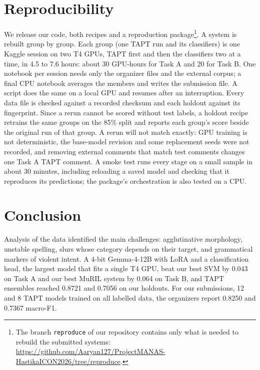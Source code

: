 \documentclass[11pt]{article}
\newcommand{\taska}{Task A}
\newcommand{\taskb}{Task B}
\begin{document}
\section{Reproducibility}
\label{sec:repro}
We release our code, both recipes and a reproduction package\footnote{The
branch \texttt{reproduce} of our repository contains only what is needed to rebuild
the submitted systems:
\url{https://github.com/Aaryan127/ProjectMANAS-HastikaICON2026/tree/reproduce}.}. A system is
rebuilt group by group. Each group (one TAPT run and its classifiers) is one
Kaggle session on two T4 GPUs, TAPT first and then the classifiers two at a
time, in 4.5 to 7.6 hours: about 30 GPU-hours for \taska{} and 20 for \taskb{}.
One notebook per session needs only the organizer files and the external
corpus; a final CPU notebook averages the members and writes
the submission file. A script does the same on a local GPU and resumes after an
interruption. Every data file is checked against a recorded checksum and each
holdout against its fingerprint. Since a rerun cannot be scored without test
labels, a holdout recipe retrains the same groups on the 85\% split and reports
each group's score beside the original run of that group. A rerun will not match
exactly: GPU training is not deterministic, the base-model revision and some
replacement seeds were not recorded, and removing external comments that match
test comments changes one \taska{} TAPT comment. A smoke test runs every stage
on a small sample in about 30 minutes, including reloading a saved model and
checking that it reproduces its predictions; the package's orchestration is also
tested on a CPU.

\section{Conclusion}
Analysis of the data identified the main challenges: agglutinative
morphology, unstable spelling, slurs whose category depends on their target, and
grammatical markers of violent intent. A 4-bit Gemma-4-12B with LoRA and a
classification head, the largest model that fits a single T4 GPU, beat our
best SVM by 0.043 on \taska{} and our best MuRIL system by 0.064 on \taskb{}, and
TAPT ensembles reached 0.8721 and 0.7056 on our holdouts. For our submissions,
12 and 8 TAPT models trained on all labelled data, the organizers report 0.8250
and 0.7367 macro-F1.
\end{document}

